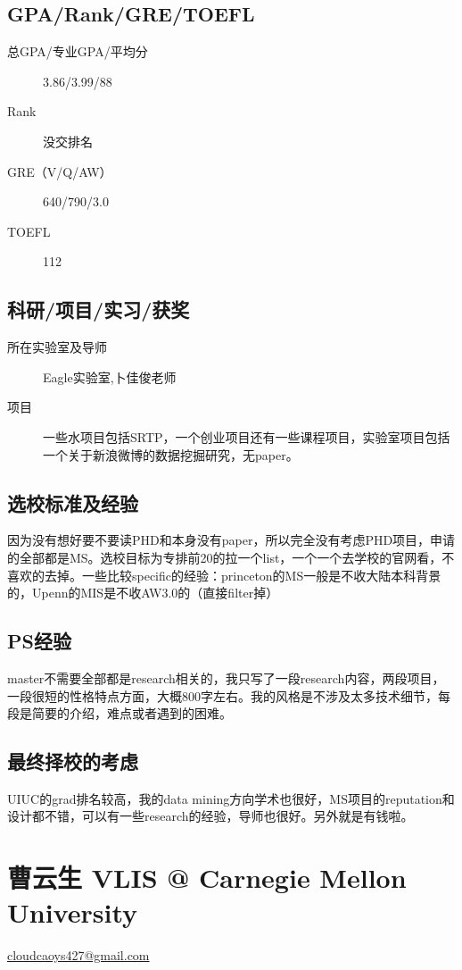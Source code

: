 \documentclass[11pt,fleqn,openany]{book} %
\begin{document}
\subsection*{GPA/Rank/GRE/TOEFL}
\begin{description}
\item[总GPA/专业GPA/平均分] 3.86/3.99/88
\item[Rank] 没交排名
\item[GRE（V/Q/AW）] 640/790/3.0
\item[TOEFL] 112
\end{description}

\subsection*{科研/项目/实习/获奖}
\begin{description}
\item[所在实验室及导师] Eagle实验室,卜佳俊老师
\item[项目] 一些水项目包括SRTP，一个创业项目还有一些课程项目，实验室项目包括一个关于新浪微博的数据挖掘研究，无paper。
\end{description}
\subsection*{选校标准及经验}
因为没有想好要不要读PHD和本身没有paper，所以完全没有考虑PHD项目，申请的全部都是MS。选校目标为专排前20的拉一个list，一个一个去学校的官网看，不喜欢的去掉。一些比较specific的经验：princeton的MS一般是不收大陆本科背景的，Upenn的MIS是不收AW3.0的（直接filter掉）
\subsection*{PS经验}
master不需要全部都是research相关的，我只写了一段research内容，两段项目，一段很短的性格特点方面，大概800字左右。我的风格是不涉及太多技术细节，每段是简要的介绍，难点或者遇到的困难。
\subsection*{最终择校的考虑}
UIUC的grad排名较高，我的data mining方向学术也很好，MS项目的reputation和设计都不错，可以有一些research的经验，导师也很好。另外就是有钱啦。
\clearpage
\section{曹云生 VLIS @ Carnegie Mellon University}
\hfill \href{mailto:cloudcaoys427@gmail.com}{cloudcaoys427@gmail.com}
\end{document}
